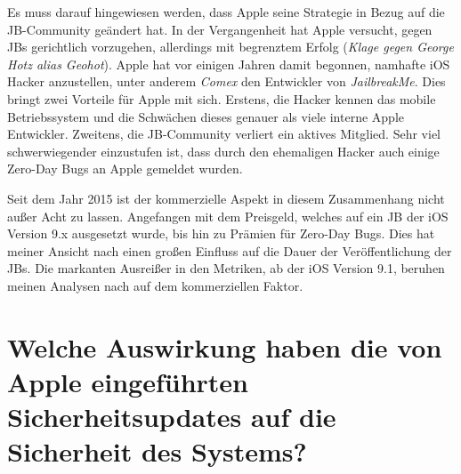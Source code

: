 Es muss darauf hingewiesen werden, dass Apple seine Strategie in Bezug auf die JB-Community geändert hat. In der Vergangenheit hat Apple versucht, gegen JBs gerichtlich vorzugehen, allerdings mit begrenztem Erfolg (\textit{\glqq Klage gegen George Hotz alias Geohot\grqq{}}). Apple hat vor einigen Jahren damit begonnen, namhafte iOS Hacker anzustellen, unter anderem \textit{\glqq Comex\grqq{}}  den Entwickler von \textit{\glqq JailbreakMe\grqq}. Dies bringt zwei Vorteile für Apple mit sich. Erstens, die Hacker kennen das mobile Betriebssystem und die Schwächen dieses genauer als viele interne Apple Entwickler.  Zweitens, die JB-Community verliert ein aktives Mitglied. Sehr viel schwerwiegender einzustufen ist, dass durch den ehemaligen Hacker auch einige Zero-Day Bugs an Apple gemeldet wurden.\par
Seit dem Jahr 2015 ist der kommerzielle Aspekt in diesem Zusammenhang nicht außer Acht zu lassen. Angefangen mit dem Preisgeld, welches auf ein JB der iOS Version 9.x ausgesetzt wurde, bis hin zu Prämien für Zero-Day Bugs. Dies hat meiner Ansicht nach einen großen Einfluss auf die Dauer der Veröffentlichung der JBs. Die markanten Ausreißer in den Metriken, ab der iOS Version 9.1, beruhen meinen Analysen nach auf dem kommerziellen Faktor. 
\newpage
\section{Welche Auswirkung haben die von Apple eingeführten Sicherheitsupdates auf die Sicherheit des Systems?}
\label{sec:Frage2}
% 

